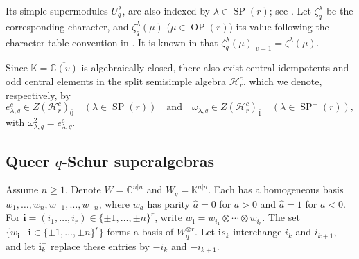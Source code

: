 \documentclass[11pt]{amsart}
\numberwithin{equation}{section}
\theoremstyle{plain}
\theoremstyle{definition}
\theoremstyle{remark}
\begin{document}
Its simple supermodules $U_q^\lambda$, are also indexed by
$\lambda\in\operatorname{SP}(r)$; see \cite[Theorem~6.7 \& Corollary~6.8]{JN99}. Let $\zeta_q^\lambda$ be the
corresponding character, and $\zeta_q^\lambda(\mu)$ ($\mu\in\operatorname{OP}(r)$) its value following the character-table convention in \cite[\S4.2]{WW13}. It is known in \cite[Proposition~2.5]{WW13} that $\zeta_q^\lambda(\mu)|_{v=1}=\zeta^\lambda(\mu)$.

Since $\mathbb{K}=\overline{\mathbb{C}(v)}$ is algebraically closed, there also exist central idempotents and odd central elements in the split semisimple algebra $\mathcal H_{r}^c$, which we denote, respectively, by
$$
e_{\lambda,q}^c\in Z(\mathcal H_r^c)_{\bar{0}}
\quad(\lambda\in\operatorname{SP}(r))\quad\text{and}\quad \omega_{\lambda,q}\in Z(\mathcal H_r^c)_{\bar{1}} \quad(\lambda\in\operatorname{SP}^-(r)),
$$
with $\omega_{\lambda,q}^2=e_{\lambda,q}^c$.





\subsection{Queer \texorpdfstring{$q$}{q}-Schur superalgebras}
Assume $n\geq1$. Denote $W=\mathbb C^{n|n}$ and $W_q=\mathbb K^{n|n}$. Each has a homogeneous basis
$w_1,\ldots,w_n,\allowbreak w_{-1},\ldots,w_{-n}$,
where $w_a$ has parity $\widehat a=\bar{0}$ for $a>0$ and
$\widehat a=\bar{1}$ for $a<0$.
For $\mathbf i=(i_1,\ldots,i_r)\in\{\pm1,\ldots,\pm n\}^r$,
write $w_{\mathbf i}=w_{i_1}\otimes\cdots\otimes w_{i_r}$. The set $\{w_{\mathbf i}\mid\mathbf i\in\{\pm1,\ldots,\pm n\}^r\}$ forms a basis of $W_q^{\otimes r}$.
Let $\mathbf i s_k$ interchange $i_k$ and $i_{k+1}$, and let
$\mathbf i_k^-$ replace these entries by $-i_k$ and $-i_{k+1}$.
\end{document}
